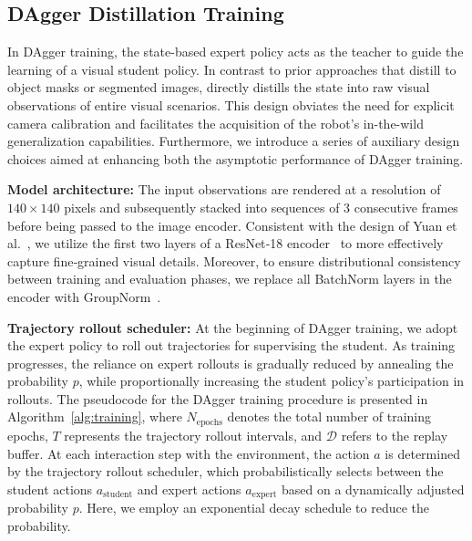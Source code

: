 \subsection{DAgger Distillation Training}

In DAgger training, the state-based expert policy acts as the teacher to guide the learning of a visual student policy.  In contrast to prior approaches that distill to object masks or segmented images, \ourshort directly distills the state into raw visual observations of entire visual scenarios. This design obviates the need for explicit camera calibration and facilitates the acquisition of the robot's in-the-wild generalization capabilities. Furthermore, we introduce a series of auxiliary design choices aimed at enhancing both the asymptotic performance of DAgger training. 

\textbf{Model architecture: } The input observations are rendered at a resolution of $140\times 140$ pixels and subsequently stacked into sequences of 3 consecutive frames before being passed to the image encoder. Consistent with the design of Yuan et al.~\cite{yuanlearning,yuan2022pre}, we utilize the first two layers of a ResNet‑18 encoder~\cite{he2016deep} to more effectively capture fine‑grained visual details. Moreover, to ensure distributional consistency between training and evaluation phases, we replace all BatchNorm layers in the encoder with GroupNorm~\cite{wu2018group}.

\textbf{Trajectory rollout scheduler:} At the beginning of DAgger training, we adopt the expert policy to roll out trajectories for supervising the student. As training progresses, the reliance on expert rollouts is gradually reduced by annealing the probability $p$, while proportionally increasing the student policy's participation in rollouts. The pseudocode for the DAgger training procedure is presented in Algorithm~\ref{alg:training}, where $N_{\text{epochs}}$ denotes the total number of training epochs, $T$ represents the trajectory rollout intervals, and $\mathcal{D}$ refers to the replay buffer. At each interaction step with the environment,
the action $a$ is determined by the trajectory rollout scheduler, which probabilistically selects between the student actions $a_{\text{student}}$ and expert actions $a_{\text{expert}}$ based on a dynamically adjusted probability $p$. Here, we employ an exponential decay schedule to reduce the probability. 

